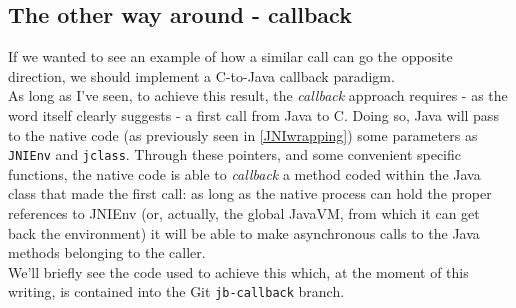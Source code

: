 \subsection{The other way around - callback}
If we wanted to see an example of how a similar call can go the opposite direction, we should implement a C-to-Java callback paradigm.\\
As long as I've seen, to achieve this result, the \textit{callback} approach requires - as the word itself clearly suggests - a first call from Java to C. Doing so, Java will pass to the native code (as previously seen in \ref{JNIwrapping}) some parameters as \texttt{JNIEnv} and \texttt{jclass}. Through these pointers, and some convenient specific functions, the native code is able to \textit{callback} a method coded within the Java class that made the first call: as long as the native process can hold the proper references to JNIEnv (or, actually, the global JavaVM, from which it can get back the environment) it will be able to make asynchronous calls to the Java methods belonging to the caller.\\
We'll briefly see the code used to achieve this which, at the moment of this writing, is contained into the Git \texttt{jb-callback} branch.
